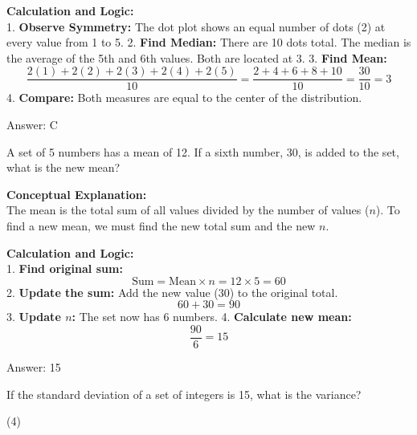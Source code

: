 \documentclass[11pt,paper=a4,answers]{exam}
\begin{document}
\begin{questions}
\begin{solution}
\vspace{30pt}

\textbf{Calculation and Logic:} \\
1. \textbf{Observe Symmetry:} The dot plot shows an equal number of dots (2) at every value from 1 to 5.
2. \textbf{Find Median:} There are 10 dots total. The median is the average of the 5th and 6th values. Both are located at 3.
3. \textbf{Find Mean:} 
\[ \frac{2(1) + 2(2) + 2(3) + 2(4) + 2(5)}{10} = \frac{2 + 4 + 6 + 8 + 10}{10} = \frac{30}{10} = 3 \]
4. \textbf{Compare:} Both measures are equal to the center of the distribution.

\vspace{30pt}

Answer: \colorbox{yellow!100}{C}
\end{solution}

\vspace{60pt}

\question
A set of 5 numbers has a mean of 12. If a sixth number, 30, is added to the set, what is the new mean?

\begin{solution}
\textbf{Conceptual Explanation:} \\
The mean is the total sum of all values divided by the number of values ($n$). To find a new mean, we must find the new total sum and the new $n$.

\vspace{30pt}

\textbf{Calculation and Logic:} \\
1. \textbf{Find original sum:} 
\[ \text{Sum} = \text{Mean} \times n = 12 \times 5 = 60 \]
2. \textbf{Update the sum:} Add the new value (30) to the original total.
\[ 60 + 30 = 90 \]
3. \textbf{Update $n$:} The set now has 6 numbers.
4. \textbf{Calculate new mean:} 
\[ \frac{90}{6} = 15 \]

\vspace{30pt}

Answer: \colorbox{yellow!100}{15}
\end{solution}

\vspace{60pt}

\question
If the standard deviation of a set of integers is 15, what is the variance?
\begin{tasks}(4)
\end{tasks}


\end{questions}
\end{document}

